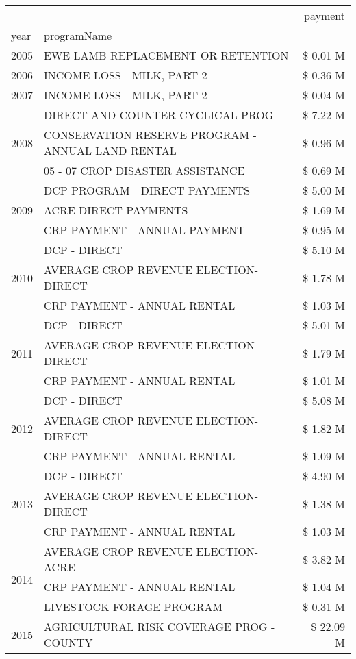 \begin{tabular}{llr}
\toprule
 &  & payment \\
year & programName &  \\
\midrule
2005 & EWE LAMB REPLACEMENT OR RETENTION & \$ 0.01 M \\
\cline{1-3}
2006 & INCOME LOSS - MILK, PART 2 & \$ 0.36 M \\
\cline{1-3}
2007 & INCOME LOSS - MILK, PART 2 & \$ 0.04 M \\
\cline{1-3}
\multirow[t]{3}{*}{2008} & DIRECT AND COUNTER CYCLICAL PROG & \$ 7.22 M \\
 & CONSERVATION RESERVE PROGRAM - ANNUAL LAND RENTAL & \$ 0.96 M \\
 & 05 - 07 CROP DISASTER ASSISTANCE & \$ 0.69 M \\
\cline{1-3}
\multirow[t]{3}{*}{2009} & DCP PROGRAM - DIRECT PAYMENTS & \$ 5.00 M \\
 & ACRE DIRECT PAYMENTS & \$ 1.69 M \\
 & CRP PAYMENT - ANNUAL PAYMENT & \$ 0.95 M \\
\cline{1-3}
\multirow[t]{3}{*}{2010} & DCP - DIRECT & \$ 5.10 M \\
 & AVERAGE CROP REVENUE ELECTION-DIRECT & \$ 1.78 M \\
 & CRP PAYMENT - ANNUAL RENTAL & \$ 1.03 M \\
\cline{1-3}
\multirow[t]{3}{*}{2011} & DCP - DIRECT & \$ 5.01 M \\
 & AVERAGE CROP REVENUE ELECTION-DIRECT & \$ 1.79 M \\
 & CRP PAYMENT - ANNUAL RENTAL & \$ 1.01 M \\
\cline{1-3}
\multirow[t]{3}{*}{2012} & DCP - DIRECT & \$ 5.08 M \\
 & AVERAGE CROP REVENUE ELECTION-DIRECT & \$ 1.82 M \\
 & CRP PAYMENT - ANNUAL RENTAL & \$ 1.09 M \\
\cline{1-3}
\multirow[t]{3}{*}{2013} & DCP - DIRECT & \$ 4.90 M \\
 & AVERAGE CROP REVENUE ELECTION-DIRECT & \$ 1.38 M \\
 & CRP PAYMENT - ANNUAL RENTAL & \$ 1.03 M \\
\cline{1-3}
\multirow[t]{3}{*}{2014} & AVERAGE CROP REVENUE ELECTION-ACRE & \$ 3.82 M \\
 & CRP PAYMENT - ANNUAL RENTAL & \$ 1.04 M \\
 & LIVESTOCK FORAGE PROGRAM & \$ 0.31 M \\
\cline{1-3}
\multirow[t]{3}{*}{2015} & AGRICULTURAL RISK COVERAGE PROG - COUNTY & \$ 22.09 M \\

\end{tabular}
